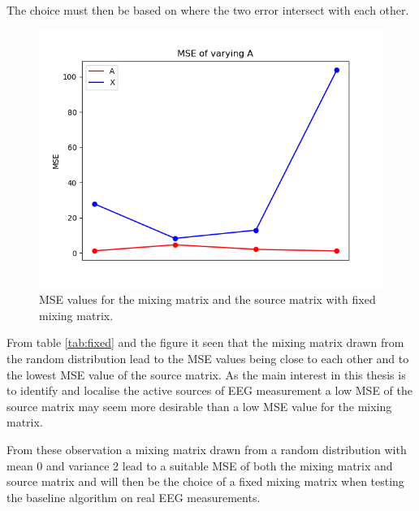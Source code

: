 The choice must then be based on where the two error intersect with each other.
\begin{figure}[H]
\centering
\includegraphics[scale=0.5]{figures/ch_6/AR_Error_vary_A_m8_k16_N16_L1000.png}
\caption{MSE values for the mixing matrix and the source matrix with fixed mixing matrix.}
\end{figure}
\noindent
From table \ref{tab:fixed} and the figure it seen that the mixing matrix drawn from the random distribution lead to the MSE values being close to each other and to the lowest MSE value of the source matrix. As the main interest in this thesis is to identify and localise the active sources of EEG measurement a low MSE of the source matrix may seem more desirable than a low MSE value for the mixing matrix. 

From these observation a mixing matrix drawn from a random distribution with mean 0 and variance 2 lead to a suitable MSE of both the mixing matrix and source matrix and will then be the choice of a fixed mixing matrix when testing the baseline algorithm on real EEG measurements.
